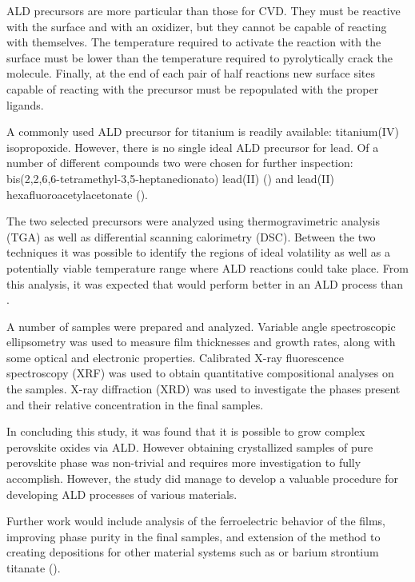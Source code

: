 ALD precursors are more particular than those for CVD. They must be reactive with the surface and with an oxidizer, but they cannot be capable of reacting with themselves. The temperature required to activate the reaction with the surface must be lower than the temperature required to pyrolytically crack the molecule. Finally, at the end of each pair of half reactions new surface sites capable of reacting with the precursor must be repopulated with the proper ligands. 

A commonly used ALD precursor for titanium is readily available: titanium(IV) isopropoxide. However, there is no single ideal ALD precursor for lead. Of a number of different compounds two were chosen for further inspection: bis(2,2,6,6-tetramethyl-3,5-heptanedionato) lead(II) (\TMHD{}) and lead(II) hexafluoroacetylacetonate (\HFAc{}). 

The two selected precursors were analyzed using thermogravimetric analysis (TGA) as well as differential scanning calorimetry (DSC). Between the two techniques it was possible to identify the regions of ideal volatility as well as a potentially viable temperature range where ALD reactions could take place. From this analysis, it was expected that \TMHD{} would perform better in an ALD process than \HFAc{}. 

A number of samples were prepared and analyzed. Variable angle spectroscopic ellipsometry was used to measure film thicknesses and growth rates, along with some optical and electronic properties. Calibrated X-ray fluorescence spectroscopy (XRF) was used to obtain quantitative compositional analyses on the samples. X-ray diffraction (XRD) was used to investigate the phases present and their relative concentration in the final samples. 

In concluding this study, it was found that it is possible to grow complex perovskite oxides via ALD. However obtaining crystallized samples of pure perovskite phase was non-trivial and requires more investigation to fully accomplish. However, the study did manage to develop a valuable procedure for developing ALD processes of various materials. 

Further work would include analysis of the ferroelectric behavior of the films, improving phase purity in the final samples, and extension of the method to creating depositions for other material systems such as \PZT{} or barium strontium titanate (). 







